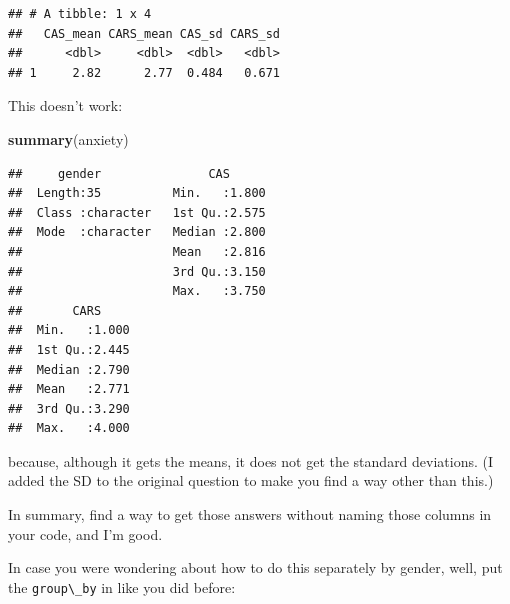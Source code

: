 \documentclass[]{tufte-book}
\newenvironment{Shaded}{}{}
\newcommand{\DecValTok}[1]{\textcolor[rgb]{0.25,0.63,0.44}{#1}}
\newcommand{\KeywordTok}[1]{\textcolor[rgb]{0.00,0.44,0.13}{\textbf{#1}}}
\newcommand{\NormalTok}[1]{#1}
\newcommand{\OperatorTok}[1]{\textcolor[rgb]{0.40,0.40,0.40}{#1}}
\newcommand{\StringTok}[1]{\textcolor[rgb]{0.25,0.44,0.63}{#1}}
\theoremstyle{definition}
\theoremstyle{definition}
\theoremstyle{definition}
\theoremstyle{remark}
\begin{document}
\begin{Shaded}
\end{Shaded}

\begin{verbatim}
## # A tibble: 1 x 4
##   CAS_mean CARS_mean CAS_sd CARS_sd
##      <dbl>     <dbl>  <dbl>   <dbl>
## 1     2.82      2.77  0.484   0.671
\end{verbatim}

This doesn't work:

\begin{Shaded}
\begin{Highlighting}[]
\KeywordTok{summary}\NormalTok{(anxiety)}
\end{Highlighting}
\end{Shaded}

\begin{verbatim}
##     gender               CAS       
##  Length:35          Min.   :1.800  
##  Class :character   1st Qu.:2.575  
##  Mode  :character   Median :2.800  
##                     Mean   :2.816  
##                     3rd Qu.:3.150  
##                     Max.   :3.750  
##       CARS      
##  Min.   :1.000  
##  1st Qu.:2.445  
##  Median :2.790  
##  Mean   :2.771  
##  3rd Qu.:3.290  
##  Max.   :4.000
\end{verbatim}

because, although it gets the means, it does not get the standard
deviations. (I added the SD to the original question to make you find a
way other than this.)

In summary, find a way to get those answers without naming those columns
in your code, and I'm good.

In case you were wondering about how to do this separately by gender,
well, put the \texttt{group\textbackslash{}\_by} in like you did before:

\begin{Shaded}
\end{Shaded}
\end{document}
